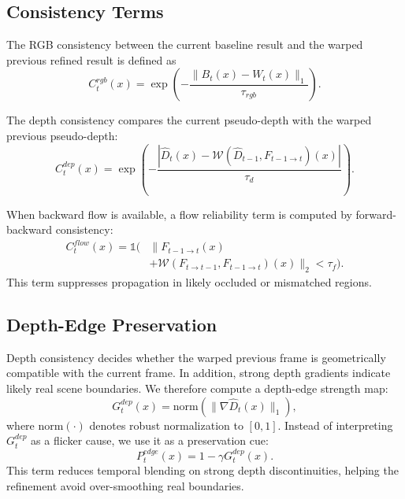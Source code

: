 \documentclass[nouppercase]{kaia}
\begin{document}
\subsection{Consistency Terms}
The RGB consistency between the current baseline result and the warped previous refined result is defined as
\begin{equation}
    C^{rgb}_t(x) = \exp\left(-\frac{\lVert B_t(x)-W_t(x) \rVert_1}{\tau_{rgb}}\right).
\end{equation}

The depth consistency compares the current pseudo-depth with the warped previous pseudo-depth:
\begin{equation}
    C^{dep}_t(x) = \exp\left(-\frac{|\hat{D}_t(x)-\mathcal{W}(\hat{D}_{t-1}, F_{t-1 \rightarrow t})(x)|}{\tau_d}\right).
\end{equation}

When backward flow is available, a flow reliability term is computed by forward-backward consistency:
\begin{equation}
    \begin{aligned}
    C^{flow}_t(x) = \mathbb{1}\big(&\lVert F_{t-1 \rightarrow t}(x) \\
    &+ \mathcal{W}(F_{t \rightarrow t-1}, F_{t-1 \rightarrow t})(x) \rVert_2 < \tau_f\big).
    \end{aligned}
\end{equation}
This term suppresses propagation in likely occluded or mismatched regions.

\subsection{Depth-Edge Preservation}
Depth consistency decides whether the warped previous frame is geometrically compatible with the current frame. In addition, strong depth gradients indicate likely real scene boundaries. We therefore compute a depth-edge strength map:
\begin{equation}
    G^{dep}_t(x) = \text{norm}\left(\lVert \nabla \hat{D}_t(x) \rVert_1\right),
\end{equation}
where $\text{norm}(\cdot)$ denotes robust normalization to $[0,1]$. Instead of interpreting $G^{dep}_t$ as a flicker cause, we use it as a preservation cue:
\begin{equation}
    P^{edge}_t(x) = 1 - \gamma G^{dep}_t(x).
\end{equation}
This term reduces temporal blending on strong depth discontinuities, helping the refinement avoid over-smoothing real boundaries.
\end{document}
